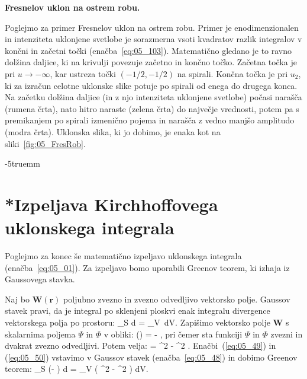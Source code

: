 \begin{example}{\bf Fresnelov uklon na ostrem robu.}
\begin{remark}
Poglejmo za primer Fresnelov uklon na ostrem robu. Primer je enodimenzionalen in 
intenziteta uklonjene svetlobe je sorazmerna vsoti 
kvadratov razlik integralov v končni in začetni točki (enačba~\ref{eq:05_103}). Matematično
gledano je to ravno dolžina daljice, ki na krivulji povezuje začetno in končno točko.
Začetna točka je pri $u \to -\infty$, kar ustreza točki $(-1/2, -1/2)$ na spirali. 
Končna točka je pri $u_2$, ki za izračun celotne uklonske slike potuje po spirali
od enega do drugega konca. Na začetku dolžina daljice (in z njo intenziteta uklonjene
svetlobe) počasi narašča (rumena črta), nato hitro naraste (zelena črta) do 
največje vrednosti, potem pa s premikanjem po spirali izmenično pojema in narašča
z vedno manjšo amplitudo (modra črta). Uklonska slika, ki jo dobimo, je enaka 
kot na sliki~\ref{fig:05_FresRob}. 
\end{remark}
\vglue-5truemm

\end{example}

\section{*Izpeljava Kirchhoffovega uklonskega integrala}
\label{chap:Kirchhoff}
Poglejmo za konec še matematično izpeljavo uklonskega integrala (enačba~\ref{eq:05_01}). 
Za izpeljavo bomo uporabili Greenov teorem, ki izhaja iz Gaussovega stavka. 

Naj bo $\mathbf{W}(\mathbf{r})$ poljubno zvezno in zvezno odvedljivo vektorsko
polje. Gaussov stavek pravi, da je integral po sklenjeni ploskvi enak
integralu divergence vektorskega polja po prostoru:
\beq
\oint_S  \cdot d = \int_V \div{}\,dV.
\label{eq:05_48}
\eeq
Zapišimo  vektorsko polje $\mathbf{W}$ s skalarnima poljema $\Psi$ in $\Phi$
v obliki:
\beq
{}() = \Psi \nabla \Phi - \Phi \nabla \Psi,
\label{eq:05_49}
\eeq
pri čemer sta funkciji $\Psi$ in $\Phi$ zvezni in dvakrat zvezno odvedljivi.
Potem velja:
\beq
\div {}= \Psi \nabla^2 \Phi - \Phi \nabla^2 \Psi. 
\label{eq:05_50}
\eeq
Enačbi~(\ref{eq:05_49}) in (\ref{eq:05_50}) vstavimo v Gaussov stavek 
(enačba~\ref{eq:05_48}) in dobimo Greenov teorem:
\beq
\oint_S \left(\Psi \nabla \Phi - \Phi \nabla \Psi\right) \cdot d  =
\int_V \left( \Psi \nabla^2 \Phi - \Phi \nabla^2 \Psi \right) dV.
\label{eq:05_51}
\eeq

